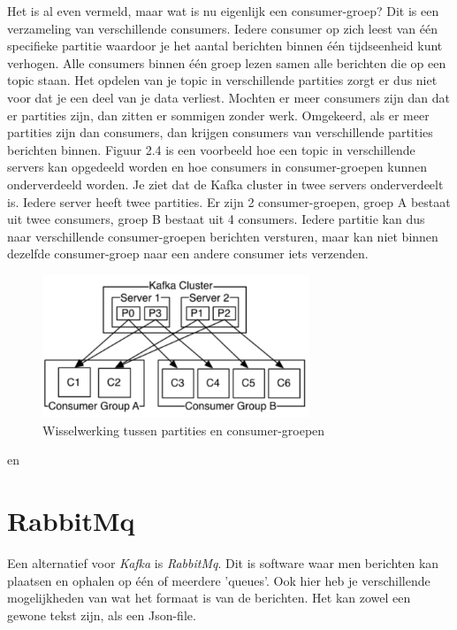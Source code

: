 Het is al even vermeld, maar wat is nu eigenlijk een consumer-groep? Dit is een verzameling van verschillende consumers. Iedere consumer op zich leest van één specifieke partitie waardoor je het aantal berichten binnen één tijdseenheid kunt verhogen. Alle consumers binnen één groep lezen samen alle berichten die op een topic staan. Het opdelen van je topic in verschillende partities zorgt er dus niet voor dat je een deel van je data verliest. Mochten er meer consumers zijn dan dat er partities zijn, dan zitten er sommigen zonder werk. Omgekeerd, als er meer partities zijn dan consumers, dan krijgen consumers van verschillende partities berichten binnen.  Figuur 2.4 is een voorbeeld hoe een topic in verschillende servers kan opgedeeld worden en hoe consumers in consumer-groepen kunnen onderverdeeld worden. Je ziet dat de Kafka cluster in twee servers onderverdeelt is. Iedere server heeft twee partities. Er zijn 2 consumer-groepen, groep A bestaat uit twee consumers, groep B bestaat uit 4 consumers. Iedere partitie kan dus naar verschillende consumer-groepen berichten versturen, maar kan niet binnen dezelfde consumer-groep naar een andere consumer iets verzenden. 

 \begin{figure}[h!]
    \centering
    \includegraphics[width=80mm]{../kafkaConsumers.png}
    \caption{Wisselwerking tussen partities en consumer-groepen}
    
\end{figure}

\autocite{Sookocheff2015} en \autocite{Johansson2016}

\section{RabbitMq}

Een alternatief voor \emph{Kafka} is \emph{RabbitMq}. Dit is software waar men berichten kan plaatsen en ophalen op één of meerdere 'queues'. Ook hier heb je verschillende mogelijkheden van wat het formaat is van de berichten. Het kan zowel een gewone tekst zijn, als een Json-file. 

